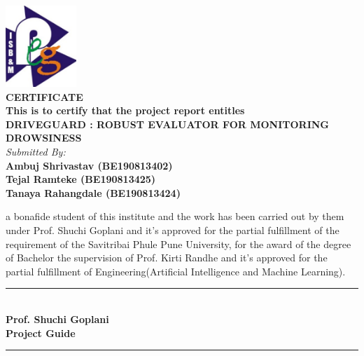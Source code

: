 \documentclass[12pt]{article}
\begin{document}
\begin{titlepage}
\begin{center}

\vspace{0.5cm}
\includegraphics[width=0.2\textwidth]{logo}\\
 \vspace{0.5cm}
\textbf{CERTIFICATE}\\
 \vspace{0.5cm}
\textbf{This is to certify that the project report entitles }\\
\textbf{DRIVEGUARD : ROBUST EVALUATOR FOR MONITORING DROWSINESS}\\
\textit{Submitted By:}\\
\vspace{0.2cm}
\normalsize
\textbf{Ambuj Shrivastav         (BE190813402)}\\
\textbf{Tejal Ramteke             (BE190813425)}\\
\textbf{Tanaya Rahangdale      (BE190813424)}\\
\vspace{0.2cm}
\end{center}


  a bonafide student of this institute and the work has been carried out by them under Prof. Shuchi Goplani and it’s approved for the partial fulfillment of the requirement of the Savitribai
Phule Pune University, for the award of the degree of Bachelor the supervision of Prof. Kirti
Randhe and it’s approved for the partial fulfillment of Engineering(Artificial Intelligence and
Machine Learning).

\vspace{1.5 cm}
\begin{minipage}[t]{0.3\textwidth}
    \centering
    \rule{4.4 cm}{1pt}\\
\textbf {Prof. Shuchi Goplani}\\
    \textbf {Project Guide}
\end{minipage}
\hfill
\begin{minipage}[t]{0.3\textwidth}

    \centering
    \rule{4.2cm}{1pt}\\


\end{minipage}
\end{titlepage}
\end{document}

